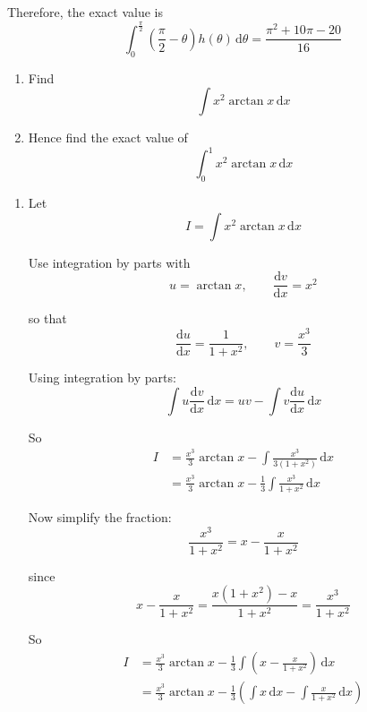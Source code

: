 \documentclass[leqno]{article}
\begin{document}
\begin{enumerate}[
  label=\textbf{\arabic*.},
  leftmargin=*,
  topsep=0pt,
  partopsep=0pt,
  parsep=0pt
]
\begin{djsSolution}
\begin{enumerate}[label=\textbf{(\alph*)}]
Therefore, the exact value is
\[
\int_{0}^{\frac{\pi}{2}}\left(\frac{\pi}{2}-\theta\right)h(\theta)\,\mathrm{d}\theta
=\frac{\pi^2+10\pi-20}{16}
\]
\end{enumerate}
\end{djsSolution}


\newpage

\questionitem

\begin{enumerate}[label=\textbf{(\alph*)}]
  \item Find
  \[
  \int x^2\arctan x\,\mathrm{d}x
  \]
  \item Hence find the exact value of
  \[
  \int_0^1 x^2\arctan x\,\mathrm{d}x
  \]
\end{enumerate}

\vspace*{10pt}

\begin{djsSolution}
\begin{enumerate}[label=\textbf{(\alph*)}]
  \item Let
\[
I=\int x^2\arctan x\,\mathrm{d}x
\]

Use integration by parts with
\[
u=\arctan x,\qquad \frac{\mathrm{d}v}{\mathrm{d}x}=x^2
\]

so that
\[
\frac{\mathrm{d}u}{\mathrm{d}x}=\frac{1}{1+x^2},\qquad v=\frac{x^3}{3}
\]

Using integration by parts:
\[
\int u\frac{\mathrm{d}v}{\mathrm{d}x}\,\mathrm{d}x = uv - \int v\frac{\mathrm{d}u}{\mathrm{d}x}\,\mathrm{d}x
\]

So
\begin{align*}
I&=\frac{x^3}{3}\arctan x-\int \frac{x^3}{3(1+x^2)}\,\mathrm{d}x\\
&=\frac{x^3}{3}\arctan x-\frac13\int \frac{x^3}{1+x^2}\,\mathrm{d}x
\end{align*}

Now simplify the fraction:
\[
\frac{x^3}{1+x^2}=x-\frac{x}{1+x^2}
\]

since
\[
x-\frac{x}{1+x^2}=\frac{x(1+x^2)-x}{1+x^2}=\frac{x^3}{1+x^2}
\]

So
\begin{align*}
I&=\frac{x^3}{3}\arctan x-\frac13\int\left(x-\frac{x}{1+x^2}\right)\,\mathrm{d}x\\
&=\frac{x^3}{3}\arctan x-\frac13\left(\int x\,\mathrm{d}x-\int \frac{x}{1+x^2}\,\mathrm{d}x\right)
\end{align*}


\end{enumerate}
\end{djsSolution}
\end{enumerate}
\end{document}
